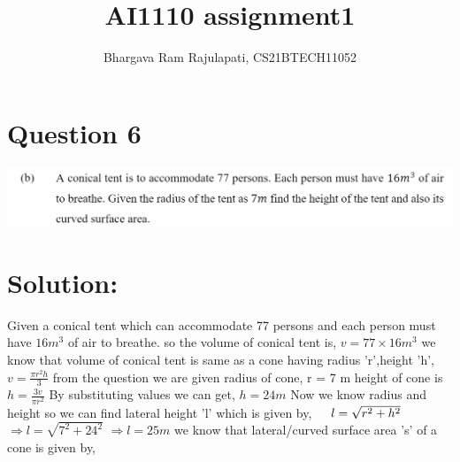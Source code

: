 \documentclass[12pt]{article}
\title{AI1110 assignment1}
\author{Bhargava Ram Rajulapati, CS21BTECH11052}
\begin{document}
  \maketitle
  \section*{Question 6}
  \includegraphics[width=\textwidth]{question.png}\newline
  \section*{Solution:}
  Given a conical tent which can accommodate 77 persons and each         
  person must have $16m^3$ of air to breathe.\newline
  so the volume of conical tent is,\newline
  $  v = 77 \times 16 m^3 $ \newline  \newline
  we know that volume of conical tent is same as a cone having
  radius 'r',height 'h', \newline
  $ v = \frac{\pi r^2 h}{3} $ \newline  \newline
  from the question we are given radius of cone, \newline
  r = 7 m \newline  
  height of cone is \newline
  $ h = \frac{3 v}{\pi r^2} $ \newline
  By substituting values we can get,  \newline
  $ h = 24 m $  \newline  \newline
  Now we know radius and height so we can find lateral height 'l'   
  which is given by,  \newline
  $\hspace*{12pt} l = \sqrt{r^2 + h^2} $  \newline
  $\Rightarrow l = \sqrt{7^2 + 24^2} $ \newline
  $\Rightarrow l = 25 m $ \newline \newline
  we know that lateral/curved surface area 's' of a cone is given
  by, \newline
\end{document}
